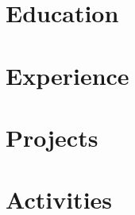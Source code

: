 \documentclass{article}
\begin{document}


\section{Education}



\section{Experience}



\section{Projects}


\section{Activities}

\end{document}
